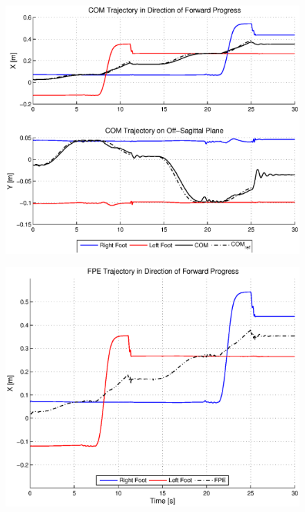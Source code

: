\begin{figure}[!h]
	\centering
    \includegraphics[scale=0.6]{fig/simulations/fwdcomtraj.eps}
  	\caption{\Incomplete}
	\label{fig:fwdcomtraj}
\end{figure}

\begin{figure}[!h]
	\centering
    \includegraphics[scale=0.7]{fig/simulations/fwdfpetraj.eps}
  	\caption{\Incomplete}
	\label{fig:fwdfpetraj}
\end{figure}

